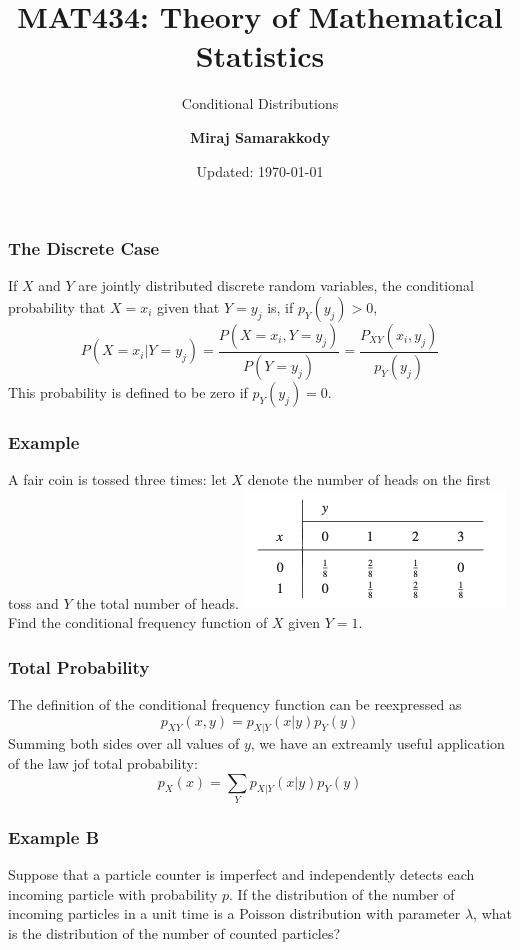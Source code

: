 \documentclass{beamer}
\title{MAT434: Theory of Mathematical Statistics}
\subtitle{Conditional Distributions \cite{RJA2006}}
\author{\textbf{Miraj Samarakkody}}
\institute{Tougaloo College}
\date{Updated: \today}
\begin{document}
\begin{frame}
    \titlepage
\end{frame}

\begin{frame}
    \frametitle{The Discrete Case}

    If \(X\) and \(Y\) are jointly distributed discrete random variables, the conditional probability that \(X=x_i\) given that \(Y=y_j\) is, if \(p_Y(y_j)>0\), \[
    P(X=x_i|Y=y_j) = \dfrac{P(X=x_i,Y=y_j)}{P(Y=y_j)}= \dfrac{P_{XY}(x_i,y_j)}{p_Y(y_j)}
    \] 
    This probability is defined to be zero if \(p_Y(y_j)=0\).

\end{frame}

\begin{frame}
    \frametitle{Example}

    A fair coin is tossed three times: let \(X\) denote the number of heads on the first toss and \(Y\) the total number of heads. 
    \includegraphics[scale=0.7]{Figures/fig_11.png}\\
    Find the conditional frequency function of \(X\) given \(Y=1\).

\end{frame}

\begin{frame}
    \frametitle{Total Probability}

    The definition of the conditional frequency function can be reexpressed as \[p_{XY}(x,y)=p_{X|Y}(x|y)p_Y(y)\] \pause
    Summing both sides over all values of \(y\), we have an extreamly useful application of the law jof total probability: 
    \[p_X(x)= \sum_Y p_{X|Y}(x|y)p_Y(y)\]
\end{frame}

\begin{frame}
    \frametitle{Example B}

    Suppose that a particle counter is imperfect and independently detects each incoming particle with probability \(p\). If the distribution of the number of incoming particles in a unit time is a Poisson distribution with parameter \(\lambda\), what is the distribution of the number of counted particles? 

\end{frame}
\end{document}
